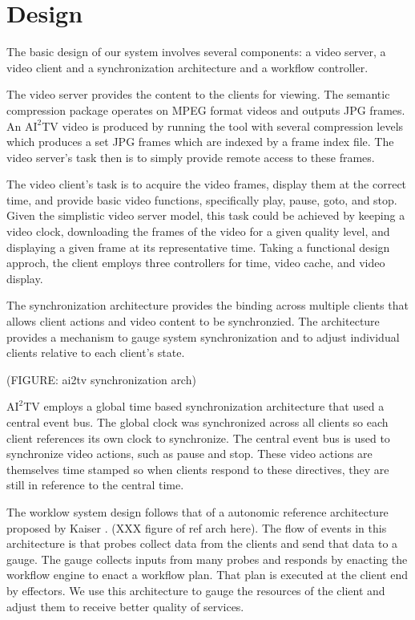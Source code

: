 \documentclass{sig-alternate}
\begin{document}
\section{Design} \label{design}

The basic design of our system involves several components: a video
server, a video client and a synchronization architecture and a
workflow controller.

The video server provides the content to the clients for viewing.  The
semantic compression package operates on MPEG format videos and
outputs JPG frames.  An $\mathrm{AI}^2$TV video is produced by running
the tool with several compression levels which produces a set JPG
frames which are indexed by a frame index file.  The video server's
task then is to simply provide remote access to these frames.

The video client's task is to acquire the video frames, display them
at the correct time, and provide basic video functions, specifically
play, pause, goto, and stop.  Given the simplistic video server model,
this task could be achieved by keeping a video clock, downloading the
frames of the video for a given quality level, and displaying a given
frame at its representative time.  Taking a functional design approch,
the client employs three controllers for time, video cache, and video
display.

The synchronization architecture provides the binding across multiple
clients that allows client actions and video content to be
synchronzied.  The architecture provides a mechanism to gauge system
synchronization and to adjust individual clients relative to each
client's state.

(FIGURE: ai2tv synchronization arch)

$\mathrm{AI}^2$TV employs a global time based synchronization
architecture that used a central event bus.  The global clock was
synchronized across all clients so each client references its own
clock to synchronize.  The central event bus is used to synchronize
video actions, such as pause and stop.  These video actions are
themselves time stamped so when clients respond to these directives,
they are still in reference to the central time.  


The worklow system design follows that of a autonomic reference
architecture proposed by Kaiser \cite{refarch}.  (XXX figure of ref
arch here).  The flow of events in this architecture is that probes
collect data from the clients and send that data to a gauge.  The
gauge collects inputs from many probes and responds by enacting the
workflow engine to enact a workflow plan.  That plan is executed at
the client end by effectors.  We use this architecture to gauge the
resources of the client and adjust them to receive better quality of
services.
\end{document}
